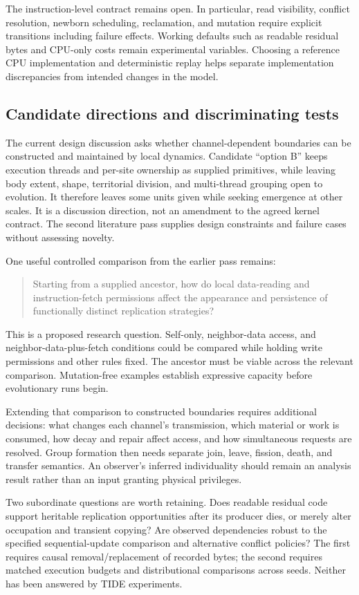 The instruction-level contract remains open. In particular, read visibility,
conflict resolution, newborn scheduling, reclamation, and mutation require
explicit transitions including failure effects. Working defaults such as
readable residual bytes and CPU-only costs remain experimental variables.
Choosing a reference CPU implementation and deterministic replay helps
separate implementation discrepancies from intended changes in the model.

\subsection{Candidate directions and discriminating tests}
The current design discussion asks whether channel-dependent boundaries can
be constructed and maintained by local dynamics. Candidate ``option B'' keeps
execution threads and per-site ownership as supplied primitives, while leaving
body extent, shape, territorial division, and multi-thread grouping open to
evolution. It therefore leaves some units given while seeking emergence at
other scales. It is a discussion direction, not an amendment to the agreed
kernel contract. The second literature pass supplies design constraints and
failure cases without assessing novelty.

One useful controlled comparison from the earlier pass remains:
\begin{quote}
Starting from a supplied ancestor, how do local data-reading and
instruction-fetch permissions affect the appearance and persistence of
functionally distinct replication strategies?
\end{quote}
This is a proposed research question. Self-only, neighbor-data access, and neighbor-data-plus-fetch
conditions could be compared while holding write permissions and other rules
fixed. The ancestor must be viable across the relevant comparison. Mutation-free
examples establish expressive capacity before evolutionary runs begin.

Extending that comparison to constructed boundaries requires additional
decisions: what changes each channel's transmission, which material or work
is consumed, how decay and repair affect access, and how simultaneous requests
are resolved. Group formation then needs separate join, leave, fission,
death, and transfer semantics. An observer's inferred individuality should
remain an analysis result rather than an input granting physical privileges.

Two subordinate questions are worth retaining. Does readable residual code
support heritable replication opportunities after its producer dies, or merely
alter occupation and transient copying? Are observed dependencies robust to
the specified sequential-update comparison and alternative conflict policies?
The first requires causal removal/replacement of recorded bytes; the second
requires matched execution budgets and distributional comparisons across
seeds. Neither has been answered by TIDE experiments.

